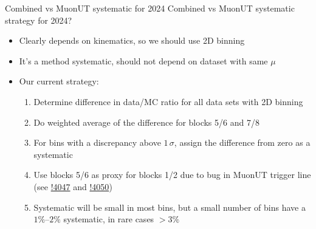\documentclass[xcolor={dvipsnames}]{beamer}
\begin{document}
\begin{frame}{Combined vs MuonUT systematic for 2024}
  \vspace{0.0cm}
  {\large Combined vs MuonUT systematic strategy for 2024?}
  \begin{itemize}
    \setlength\itemsep{1.0em}
    \item{Clearly depends on kinematics, so we should use 2D binning}
    \item{It's a method systematic, should not depend on dataset with same $\mu$}
    \item{Our current strategy:}
    \begin{enumerate}
      \setlength\itemsep{0.5em}
      \item{Determine difference in data/MC ratio for all data sets with 2D binning}
      \item{Do weighted average of the difference for blocks 5/6 and 7/8}
      \item{For bins with a discrepancy above $1\,\sigma$, assign the difference from zero as a systematic}
      \item{Use blocks 5/6 as proxy for blocks 1/2 due to bug in MuonUT trigger line (see \href{https://gitlab.cern.ch/lhcb/Rec/-/merge_requests/4047}{!4047} and \href{https://gitlab.cern.ch/lhcb/Rec/-/merge_requests/4050}{!4050})}
      \item{Systematic will be small in most bins, but a small number of bins have a $1\%$--$2\%$ systematic, in rare cases $> 3\%$}
    \end{enumerate}
  \end{itemize}
\end{frame}
\end{document}
